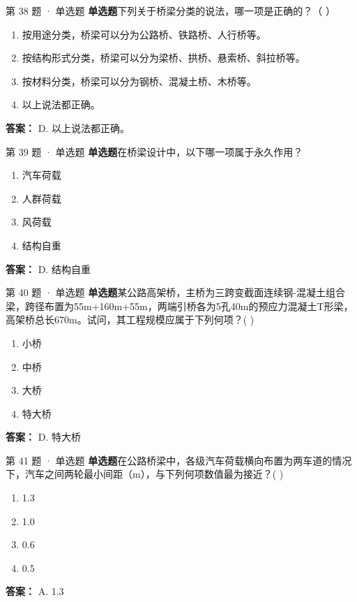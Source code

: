 \documentclass[UTF8,zihao=-4,openany]{ctexbook}
\newenvironment{choices}{\begin{enumerate}[label=\Alph*.,leftmargin=9mm,labelsep=3mm,itemsep=2pt,topsep=4pt]}{\end{enumerate}}
\newcommand{\qtype}[1]{\textcolor{brand}{\sffamily\bfseries #1}}
\begin{document}
\begin{questionbox}{第 38 题 · 单选题}
\qtype{单选题}\quad 下列关于桥梁分类的说法，哪一项是正确的？（ ）
\begin{choices}
\item 按用途分类，桥梁可以分为公路桥、铁路桥、人行桥等。
\item 按结构形式分类，桥梁可以分为梁桥、拱桥、悬索桥、斜拉桥等。
\item 按材料分类，桥梁可以分为钢桥、混凝土桥、木桥等。
\item 以上说法都正确。
\end{choices}
\begin{answerbox}
\textbf{答案：} D. 以上说法都正确。
\end{answerbox}
\end{questionbox}

\begin{questionbox}{第 39 题 · 单选题}
\qtype{单选题}\quad 在桥梁设计中，以下哪一项属于永久作用？
\begin{choices}
\item 汽车荷载
\item 人群荷载
\item 风荷载
\item 结构自重
\end{choices}
\begin{answerbox}
\textbf{答案：} D. 结构自重
\end{answerbox}
\end{questionbox}

\begin{questionbox}{第 40 题 · 单选题}
\qtype{单选题}\quad 某公路高架桥，主桥为三跨变截面连续钢-混凝土组合梁，跨径布置为55m+160m+55m，两端引桥各为5孔40m的预应力混凝土T形梁，高架桥总长670m。试问，其工程规模应属于下列何项？( )
\begin{choices}
\item 小桥
\item 中桥
\item 大桥
\item 特大桥
\end{choices}
\begin{answerbox}
\textbf{答案：} D. 特大桥
\end{answerbox}
\end{questionbox}

\begin{questionbox}{第 41 题 · 单选题}
\qtype{单选题}\quad 在公路桥梁中，各级汽车荷载横向布置为两车道的情况下，汽车之间两轮最小间距（m），与下列何项数值最为接近？( )
\begin{choices}
\item 1.3
\item 1.0
\item 0.6
\item 0.5
\end{choices}
\begin{answerbox}
\textbf{答案：} A. 1.3
\end{answerbox}
\end{questionbox}
\end{document}
